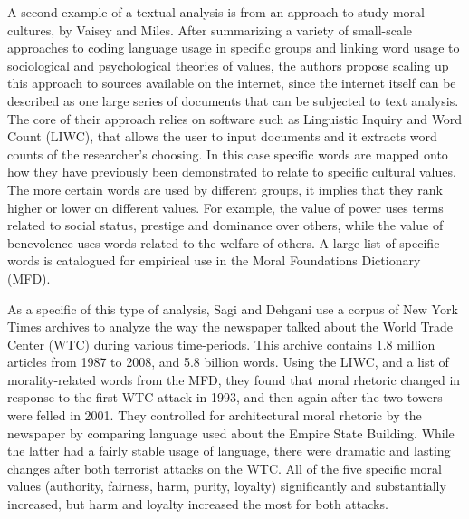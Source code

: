 \documentclass[sigconf]{acmart}
\begin{document}
A second example of a textual analysis is from an approach to study moral cultures, by Vaisey and Miles. \cite{vaisey14}  After summarizing a variety of small-scale approaches to coding language usage in specific groups and linking word usage to sociological and psychological theories of values, the authors propose scaling up this approach to sources available on the internet, since the internet itself can be described as one large series of documents that can be subjected to text analysis.  The core of their approach relies on software such as  Linguistic Inquiry and Word Count (LIWC), that allows the user to input documents and it extracts word counts of the researcher's choosing.  In this case specific words are mapped onto how they have previously been demonstrated to relate to specific cultural values.  The more certain words are used by different groups, it implies that they rank higher or lower on different values.  For example, the value of power uses terms related to social status, prestige and dominance over others, while the value of benevolence uses words related to the welfare of others.  A large list of specific words is catalogued for empirical use in the Moral Foundations Dictionary (MFD).  \cite{vaisey14}  

As a specific of this type of analysis, Sagi and Dehgani use a corpus of New York Times archives to analyze the way the newspaper talked about the World Trade Center (WTC) during various time-periods. \cite{sagi14} This archive contains 1.8 million articles from 1987 to 2008, and 5.8 billion words.  Using the LIWC, and a list of morality-related words from the MFD, they found that moral rhetoric changed in response to the first WTC attack in 1993, and then again after the two towers were felled in 2001.  They controlled for architectural moral rhetoric by the newspaper by comparing language used about the Empire State Building.  While the latter had a fairly stable usage of language, there were dramatic and lasting changes after both terrorist attacks on the WTC.  All of the five specific moral values (authority, fairness, harm, purity, loyalty) significantly and substantially increased, but harm and loyalty increased the most for both attacks.
\end{document}

